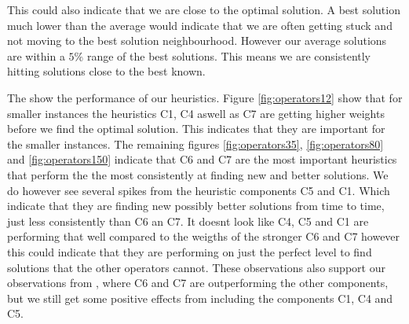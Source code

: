 \documentclass[../main.tex]{subfiles}
\begin{document}
This could also indicate that we are close to the optimal solution. 
A best solution much lower than the average would indicate that we are often getting stuck and not moving to the best solution neighbourhood. 
However our average solutions are within a $5\%$ range of the best solutions.
This means we are consistently hitting solutions close to the best known.
\par
The  show the performance of our heuristics.
Figure \ref{fig:operators12} show that for smaller instances the heuristics C1, C4 aswell as C7 are getting higher weights before we find the optimal solution. This indicates that they are important for the smaller instances.
The remaining figures \ref{fig:operators35}, \ref{fig:operators80} and \ref{fig:operators150} indicate that C6 and C7 are the most important heuristics that perform the the most consistently at finding new and better solutions. 
We do however see several spikes from the heuristic components C5 and C1. 
Which indicate that they are finding new possibly better solutions from time to time, just less consistently than C6 an C7. 
It doesnt look like C4, C5 and C1 are performing that well compared to the weigths of the stronger C6 and C7 however this could indicate that they are performing on just the perfect level to find solutions that the other operators cannot. 
These observations also support our observations from , where C6 and C7 are outperforming the other components, but we still get some positive effects from including the components C1, C4 and C5. 

\biblio                                                         
\end{document}
